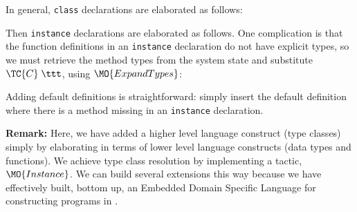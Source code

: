 \noindent
In general, \texttt{class} declarations are elaborated as follows:


\noindent
Then \texttt{instance} declarations are elaborated as follows. One complication
is that the function definitions in an \texttt{instance} declaration do not
have explicit types, so we must retrieve the method types from the system state
and substitute $\TC{C}\;\ttt$, using $\MO{ExpandTypes}$:


Adding default definitions is straightforward: simply insert the default definition where
there is a method missing in an \texttt{instance} declaration.

\textbf{Remark:} Here, we have added a higher level language construct (type
classes) simply by elaborating in terms of lower level language constructs
(data types and functions).  We achieve type class resolution by implementing a
tactic, $\MO{Instance}$.  We can build several extensions this way because we
have effectively built, bottom up, an Embedded Domain Specific Language for
constructing programs in \TT{}.

